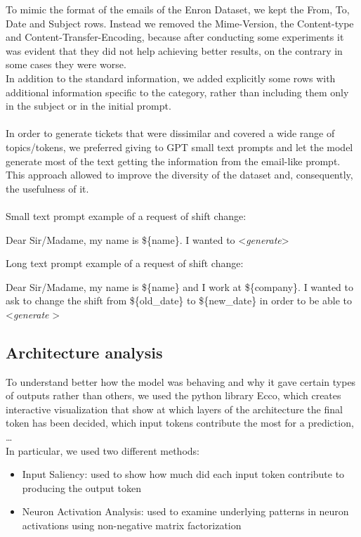 To mimic the format of the emails of the Enron Dataset, we kept the From, To, Date and Subject rows. Instead we removed the Mime-Version, the Content-type and Content-Transfer-Encoding, because after conducting some experiments it was evident that they did not help achieving better results, on the contrary in some cases they were worse. \\
In addition to the standard information, we added explicitly some rows with additional information specific to the category, rather than including them only in the subject or in the initial prompt. \\
\\
In order to generate tickets that were dissimilar and covered a wide range of topics/tokens, we preferred giving to GPT small text prompts and let the model generate most of the text getting the information from the email-like prompt. This approach allowed to improve the diversity of the dataset and, consequently, the usefulness of it. \\
\\
Small text prompt example of a request of shift change:
\begin{adjustwidth}{1cm}{}
    Dear Sir/Madame, my name is \$\{name\}. I wanted to \textless \textit{generate}\textgreater
\end{adjustwidth}

Long text prompt example of a request of shift change:
\begin{adjustwidth}{1cm}{}
    Dear Sir/Madame, my name is \$\{name\} and I work at \$\{company\}. I wanted to ask to change the shift from \$\{old\_date\} to \$\{new\_date\} in order to be able to \textless \textit{generate} \textgreater
\end{adjustwidth}

\subsection*{Architecture analysis}
To understand better how the model was behaving and why it gave certain types of outputs rather than others, we used the python library Ecco, which creates interactive visualization that show at which layers of the architecture the final token has been decided, which input tokens contribute the most for a prediction, \dots \\
In particular, we used two different methods:
\begin{itemize}
    \item Input Saliency: used to show how much did each input token contribute to producing the output token
    \item Neuron Activation Analysis: used to examine underlying patterns in neuron activations using non-negative matrix factorization
\end{itemize}
